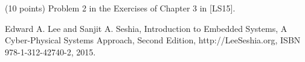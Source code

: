 \documentclass[a4paper,12pt]{article}
\begin{document}
\begin{problem}{}
(10 points) Problem 2 in the Exercises of Chapter 3 in [LS15].

\noindent
[LS15] Edward A. Lee and Sanjit A. Seshia, Introduction to Embedded Systems, A Cyber-Physical Systems Approach, Second Edition, http://LeeSeshia.org, ISBN 978-1-312-42740-2, 2015. \\
\\
\begin{minipage}{1\textwidth}
  \rectangle{\linewidth}{22cm}
\end{minipage}
\newpage
\ \\
\begin{minipage}{1\textwidth}
  \rectangle{\linewidth}{24cm}
\end{minipage}
\newpage
\ \\
\begin{minipage}{1\textwidth}
  \rectangle{\linewidth}{24cm}
\end{minipage}
\newpage
\ \\
\begin{minipage}{1\textwidth}
  \rectangle{\linewidth}{24cm}
\end{minipage}
\end{problem}

\newpage
\end{document}
